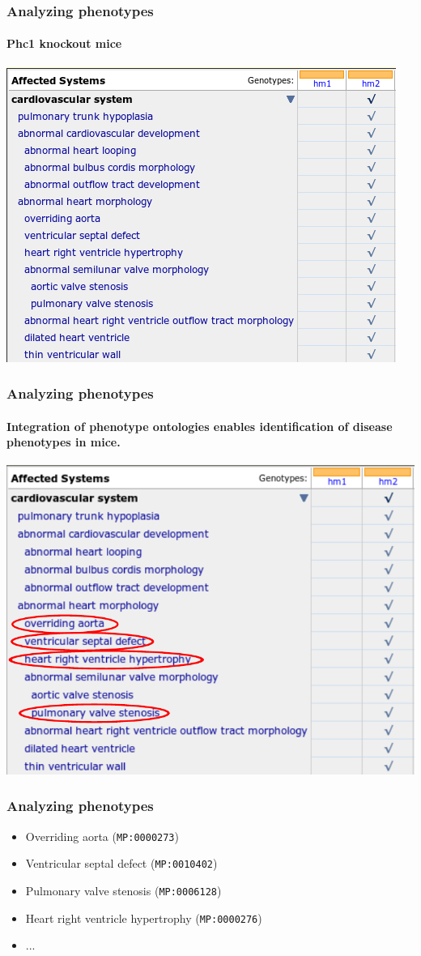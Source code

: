 \documentclass{beamer}
\begin{document}
\begin{frame}
  \frametitle{Analyzing phenotypes}
  \framesubtitle{Phc1 knockout mice}
  \centerline{\includegraphics[width=.8\textwidth]{phc1-model.png}}
\end{frame}

\begin{frame}
  \frametitle{Analyzing phenotypes}
  \framesubtitle{Integration of phenotype ontologies enables
    identification of disease phenotypes in mice.}
  \centerline{\includegraphics[height=.8\textheight]{phc1-model-marked.pdf}}
\end{frame}

\begin{frame}
  \frametitle{Analyzing phenotypes}
  \begin{itemize}
  \item Overriding aorta ({\tt MP:0000273})
  \item Ventricular septal defect ({\tt MP:0010402})
  \item Pulmonary valve stenosis ({\tt MP:0006128})
  \item Heart right ventricle hypertrophy ({\tt MP:0000276})
  \item ...
  \end{itemize}
\end{frame}
\end{document}
